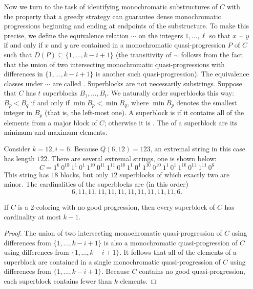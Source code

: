 Now we turn to the task of identifying monochromatic substructures of $C$ with the property that a greedy strategy can guarantee dense monochromatic progressions beginning and ending at endpoints of the substructure. To make this precise, we define the equivalence relation $\sim$ on the integers $1,\ldots,\ell$ so that $x \sim y$ if and only if $x$ and $y$ are contained in a monochromatic quasi-progression $P$ of $C$ such that $D(P) \subseteq \{1,\ldots,k-i+1\}$ (the transitivity of $\sim$ follows from the fact that the union of two intersecting monochromatic quasi-progressions with differences in $\{1,\ldots,k-i+1\}$ is another such quasi-progression). The equivalence classes under $\sim$ are called . Superblocks are not necessarily substrings. Suppose that $C$ has $t$ superblocks $B_1,\ldots,B_t$. We naturally order superblocks this way: $B_p < B_q$ if and only if $\min B_p < \min B_q$, where $\min B_p$ denotes the smallest integer in $B_p$ (that is, the left-most one). A superblock is  if it contains all of the elements from a major block of $C$; otherwise it is . The  of a superblock are its minimum and maximum elements.

\begin{example} Consider $k = 12, i = 6$. Because $Q(6,12) = 123$, an extremal string in this case has length $122$. There are several extremal strings, one is shown below: \[C =  1^{6}\ 0^{10}\ 1^{1}\ 0^{1}\ 1^{10}\ 0^{11}\ 1^{11}\ 0^{10}\ 1^{1}\ 0^{1}\ 1^{10}\ 0^{10}\ 1^{1}\ 0^{1}\ 1^{10}\ 0^{11}\ 1^{11}\ 0^{6}\] This string has $18$ blocks, but only $12$ superblocks of which exactly two are minor. The cardinalities of the superblocks are (in this order) \[6, 11, 11,11, 11,11, 11,11, 11,11, 11, 6.\]
\end{example}

\begin{theorem}\label{thm:SuperBlockUpperBound} If $C$ is a $2$-coloring with no good progression, then every superblock of $C$ has cardinality at most $k-1$.
\end{theorem}
\begin{proof}
The union of two intersecting monochromatic quasi-progression of $C$ using differences from $\{1,\ldots,k-i+1\}$ is also a monochromatic quasi-progression of $C$ using differences from $\{1,\ldots,k-i+1\}$. It follows that all of the elements of a superblock are contained in a single monochromatic quasi-progression of $C$ using differences from $\{1,\ldots,k-i+1\}$. Because $C$ contains no good quasi-progression, each superblock contains fewer than $k$ elements.
\end{proof}

